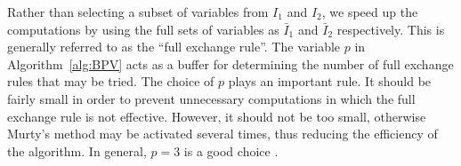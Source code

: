\documentclass[11pt]{article}
\newcommand{\0}{\phantom{0}}
\begin{document}
Rather than selecting a subset of variables from $I_{1}$ and $I_{2}$, we speed up the computations by using the full sets of variables as $\bar{I}_{1}$ and $\bar{I}_{2}$ respectively. This is generally referred to as the ``full exchange rule''. The variable $p$ in Algorithm~\ref{alg:BPV} acts as a buffer for determining the number of full exchange rules that may be tried. The choice of $p$ plays an important rule. It should be fairly small in order to prevent unnecessary computations in which the full exchange rule is not effective. However, it should not be too small, otherwise Murty's method may be activated several times, thus reducing the efficiency of the algorithm. In general, $p = 3$ is a good choice \citep{Judice1994}.




\end{document}
